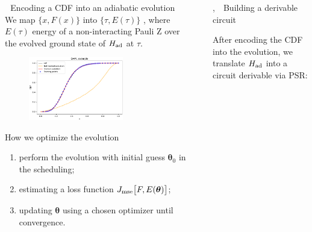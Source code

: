 \documentclass[20pt, final]{beamer}
\newlength{\sepwidth}
\newlength{\colwidth}
\newcommand{\separatorcolumn}{\begin{column}{\sepwidth}\end{column}}
\begin{document}
\begin{frame}[t]
\begin{columns}[t]
\begin{column}{\colwidth}
\begin{block}{\faChain\,\, Encoding a CDF into an adiabatic evolution}
  We map $\{x, F(x)\}$ into $\{\tau, E(\tau)\}$ , where $E(\tau)$ energy of a 
  non-interacting Pauli Z over the evolved ground state of $H_{\rm ad}$ at $\tau$.

  \begin{figure}
    \includegraphics[width=0.7\textwidth]{figures/evolution.pdf}
  \end{figure}
  \end{block}

  \begin{alertblock}{How we optimize the evolution}
  
  \begin{enumerate}
    \item perform the evolution with initial guess $\bm{\theta}_0$ in the scheduling;
    \item estimating a loss function $J_{\rm mse}\bigl[F, E(\bm{\theta})\bigr]$;
    \item updating $\bm{\theta}$ using a chosen optimizer until convergence.
  \end{enumerate}

  \end{alertblock}


\end{column}

\separatorcolumn

\begin{column}{\colwidth}

  \begin{block}{\faPencil, \faCogs\,\, Building a derivable circuit}
  
After encoding the CDF into the evolution, we translate $H_{\rm ad}$ into a circuit
derivable via PSR:


\end{block}
\end{column}
\end{columns}
\end{frame}
\end{document}
